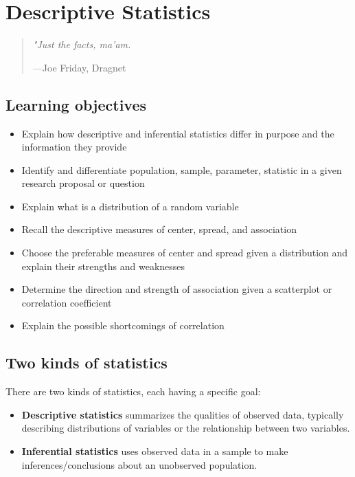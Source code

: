 \documentclass[
]{book}
\providecommand{\tightlist}{%
  \setlength{\itemsep}{0pt}\setlength{\parskip}{0pt}}
\newenvironment{learncheck}%
{%
  \par\vspace{\baselineskip}\noindent 
  \color{Exercise}\begin{itshape}%
  \par\vspace{\baselineskip}\noindent\ignorespaces 
}%
{%
  \end{itshape}\ignorespacesafterend 
}
\begin{document}
\hypertarget{descriptive-statistics}{%
\chapter{Descriptive Statistics}\label{descriptive-statistics}}

\begin{quote}
\emph{"Just the facts, ma'am.}

---Joe Friday, Dragnet
\end{quote}

\hypertarget{lo4}{%
\section{Learning objectives}\label{lo4}}

\begin{learncheck}
\begin{itemize}
\tightlist
\item
  Explain how descriptive and inferential statistics differ in purpose
  and the information they provide
\item
  Identify and differentiate population, sample, parameter, statistic in
  a given research proposal or question
\item
  Explain what is a distribution of a random variable
\item
  Recall the descriptive measures of center, spread, and association
\item
  Choose the preferable measures of center and spread given a
  distribution and explain their strengths and weaknesses
\item
  Determine the direction and strength of association given a
  scatterplot or correlation coefficient
\item
  Explain the possible shortcomings of correlation
\end{itemize}
\end{learncheck}

\hypertarget{two-kinds-of-statistics}{%
\section{Two kinds of statistics}\label{two-kinds-of-statistics}}

There are two kinds of statistics, each having a specific goal:

\begin{itemize}
\item
  \textbf{Descriptive statistics} summarizes the qualities of observed data, typically describing distributions of variables or the relationship between two variables.
\item
  \textbf{Inferential statistics} uses observed data in a sample to make inferences/conclusions about an unobserved population.
\end{itemize}
\end{document}
